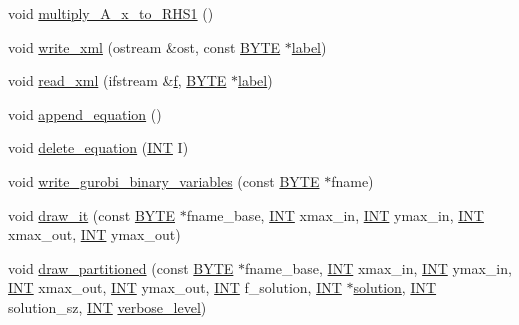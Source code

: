 \begin{DoxyCompactItemize}
\item 
void \mbox{\hyperlink{classdiophant_ae6f3c4bb82b979701c67049310d824e6}{multiply\+\_\+\+A\+\_\+x\+\_\+to\+\_\+\+R\+H\+S1}} ()
\item 
void \mbox{\hyperlink{classdiophant_adfbc14e5783cc749f4ddf1880aab63a0}{write\+\_\+xml}} (ostream \&ost, const \mbox{\hyperlink{galois_8h_ab6cc7b4aeb6ea31aba2b3fbfc83ff5e6}{B\+Y\+TE}} $\ast$\mbox{\hyperlink{classdiophant_a5f8790fdf02bf65c8c783948f46af3bb}{label}})
\item 
void \mbox{\hyperlink{classdiophant_a56bf6e90f2b106f051f0735bb118cec6}{read\+\_\+xml}} (ifstream \&\mbox{\hyperlink{alphabet2_8_c_a362077c979b0bb65159c603270e40f70}{f}}, \mbox{\hyperlink{galois_8h_ab6cc7b4aeb6ea31aba2b3fbfc83ff5e6}{B\+Y\+TE}} $\ast$\mbox{\hyperlink{classdiophant_a5f8790fdf02bf65c8c783948f46af3bb}{label}})
\item 
void \mbox{\hyperlink{classdiophant_ab0ddcea782ccecdabf75f2277c9e8bd1}{append\+\_\+equation}} ()
\item 
void \mbox{\hyperlink{classdiophant_a358275d27c4c84ec1314c0b2fa027f7e}{delete\+\_\+equation}} (\mbox{\hyperlink{galois_8h_a09fddde158a3a20bd2dcadb609de11dc}{I\+NT}} I)
\item 
void \mbox{\hyperlink{classdiophant_a38d1f2d6fc7ca8a1eebfcc30a07fe9ad}{write\+\_\+gurobi\+\_\+binary\+\_\+variables}} (const \mbox{\hyperlink{galois_8h_ab6cc7b4aeb6ea31aba2b3fbfc83ff5e6}{B\+Y\+TE}} $\ast$fname)
\item 
void \mbox{\hyperlink{classdiophant_a2d767259ba2547eb19000e02a0035f08}{draw\+\_\+it}} (const \mbox{\hyperlink{galois_8h_ab6cc7b4aeb6ea31aba2b3fbfc83ff5e6}{B\+Y\+TE}} $\ast$fname\+\_\+base, \mbox{\hyperlink{galois_8h_a09fddde158a3a20bd2dcadb609de11dc}{I\+NT}} xmax\+\_\+in, \mbox{\hyperlink{galois_8h_a09fddde158a3a20bd2dcadb609de11dc}{I\+NT}} ymax\+\_\+in, \mbox{\hyperlink{galois_8h_a09fddde158a3a20bd2dcadb609de11dc}{I\+NT}} xmax\+\_\+out, \mbox{\hyperlink{galois_8h_a09fddde158a3a20bd2dcadb609de11dc}{I\+NT}} ymax\+\_\+out)
\item 
void \mbox{\hyperlink{classdiophant_aea00280a322e4ad069a8de1e483790d0}{draw\+\_\+partitioned}} (const \mbox{\hyperlink{galois_8h_ab6cc7b4aeb6ea31aba2b3fbfc83ff5e6}{B\+Y\+TE}} $\ast$fname\+\_\+base, \mbox{\hyperlink{galois_8h_a09fddde158a3a20bd2dcadb609de11dc}{I\+NT}} xmax\+\_\+in, \mbox{\hyperlink{galois_8h_a09fddde158a3a20bd2dcadb609de11dc}{I\+NT}} ymax\+\_\+in, \mbox{\hyperlink{galois_8h_a09fddde158a3a20bd2dcadb609de11dc}{I\+NT}} xmax\+\_\+out, \mbox{\hyperlink{galois_8h_a09fddde158a3a20bd2dcadb609de11dc}{I\+NT}} ymax\+\_\+out, \mbox{\hyperlink{galois_8h_a09fddde158a3a20bd2dcadb609de11dc}{I\+NT}} f\+\_\+solution, \mbox{\hyperlink{galois_8h_a09fddde158a3a20bd2dcadb609de11dc}{I\+NT}} $\ast$\mbox{\hyperlink{hill_8_c_a260dc4df2fddf5f0fa5dd8d5b8210a11}{solution}}, \mbox{\hyperlink{galois_8h_a09fddde158a3a20bd2dcadb609de11dc}{I\+NT}} solution\+\_\+sz, \mbox{\hyperlink{galois_8h_a09fddde158a3a20bd2dcadb609de11dc}{I\+NT}} \mbox{\hyperlink{simeon_8_c_a818073fbcc2f439e7c56952f67386122}{verbose\+\_\+level}})

\end{DoxyCompactItemize}
